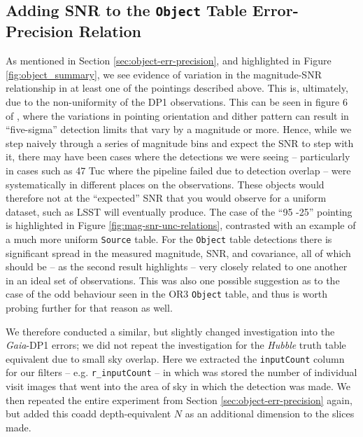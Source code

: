 \documentclass[SE,lsstdraft,authoryear,toc]{lsstdoc}
\begin{document}
\subsection{Adding SNR to the \texttt{Object} Table Error-Precision Relation}
\label{sec:object-snr-error-precision}
As mentioned in Section \ref{sec:object-err-precision}, and highlighted in Figure \ref{fig:object_summary}, we see evidence of variation in the magnitude-SNR relationship in at least one of the pointings described above.
This is, ultimately, due to the non-uniformity of the DP1 observations.
This can be seen in figure 6 of \citet{Guy2025}, where the variations in pointing orientation and dither pattern can result in ``five-sigma'' detection limits that vary by a magnitude or more.
Hence, while we step naively through a series of magnitude bins and expect the SNR to step with it, there may have been cases where the detections we were seeing -- particularly in cases such as 47 Tuc where the pipeline failed due to detection overlap -- were systematically in different places on the observations.
These objects would therefore not at the ``expected'' SNR that you would observe for a uniform dataset, such as LSST will eventually produce.
The case of the ``95 -25'' pointing is highlighted in Figure \ref{fig:mag-snr-unc-relations}, contrasted with an example of a much more uniform \texttt{Source} table.
For the \texttt{Object} table detections there is significant spread in the measured magnitude, SNR, and covariance, all of which should be -- as the second result highlights -- very closely related to one another in an ideal set of observations.
This was also one possible suggestion as to the case of the odd behaviour seen in the OR3 \texttt{Object} table, and thus is worth probing further for that reason as well.

We therefore conducted a similar, but slightly changed investigation into the \textit{Gaia}-DP1 errors; we did not repeat the investigation for the \textit{Hubble} truth table equivalent due to small sky overlap.
Here we extracted the \texttt{inputCount} column for our filters -- e.g. \texttt{r\_inputCount} -- in which was stored the number of individual visit images that went into the area of sky in which the detection was made.
We then repeated the entire experiment from Section \ref{sec:object-err-precision} again, but added this coadd depth-equivalent $N$ as an additional dimension to the slices made.
\end{document}
